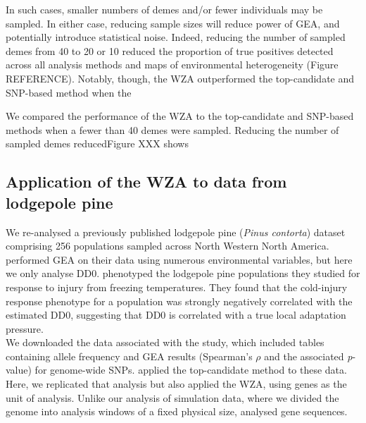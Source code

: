 \documentclass[10pt,twoside,lineno, twocolumn]{GSA_format}
\begin{document}
In such cases, smaller numbers of demes and/or fewer individuals may be sampled. In either case, reducing sample sizes will reduce power of GEA, and potentially introduce statistical noise.
Indeed, reducing the number of sampled demes from 40 to 20 or 10 reduced the proportion of true positives detected across all analysis methods and maps of environmental heterogeneity (Figure REFERENCE). Notably, though, the WZA outperformed the top-candidate and SNP-based method when the  

We compared the performance of the WZA to the top-candidate and SNP-based methods when a fewer than 40 demes were sampled. Reducing the number of sampled demes reducedFigure XXX shows 

\subsection{Application of the WZA to data from lodgepole pine}

We re-analysed a previously published \citep{Yeaman2016} lodgepole pine (\textit{Pinus contorta}) dataset comprising 256 populations sampled across North Western North America.\cite{Yeaman2016} performed GEA on their data using numerous environmental variables, but here we only analyse DD0. \cite{Yeaman2016} phenotyped the lodgepole pine populations they studied for response to injury from freezing temperatures. They found that the cold-injury response phenotype for a population was strongly negatively correlated with the estimated DD0, suggesting that DD0 is correlated with a true local adaptation pressure. \\

We downloaded the data associated with the \cite{Yeaman2016} study, which included tables containing allele frequency and GEA results (Spearman's $\rho$ and the associated \textit{p}-value) for genome-wide SNPs. \cite{Yeaman2016} applied the top-candidate method to these data. Here, we replicated that analysis but also applied the WZA, using genes as the unit of analysis. Unlike our analysis of simulation data, where we divided the genome into analysis windows of a fixed physical size, \cite{Yeaman2016} analysed gene sequences. \\
\end{document}
